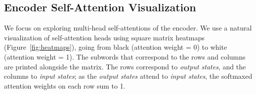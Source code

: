 \documentclass[11pt,a4paper]{article}
\newcommand{\words}{\emph{input states}\xspace}
\newcommand{\states}{\emph{output states}\xspace}
\def\RR#1{{\color{blue}RR: \it #1}}
\def\JL#1{{\color{magenta}JL: \it #1}}
\def\DEL#1{{\color{green}SMAZAT: \it #1}}
\def\JL#1{}
\def\RR#1{}
\def\DEL#1{}
\begin{document}




\subsection{Encoder Self-Attention Visualization}

We focus
on exploring multi-head self-attentions of the encoder.
We use a natural visualization of self-attention heads using square matrix heatmaps (Figure~\ref{fig:heatmaps}), going from black (attention weight = 0) to white (attention weight = 1). The subwords that correspond to the rows and columns are printed alongside the matrix.
The rows correspond to \states, and the columns to \words;
as the \states attend to \words, the softmaxed attention weights on each row sum to 1.
\DEL{For each sentence, for each layer, and for each head, there is a square matrix of attention weights.}
\DEL{It follows that there cannot be too many bright squares in one row, but there can be many bright squares in one column.}
\end{document}
